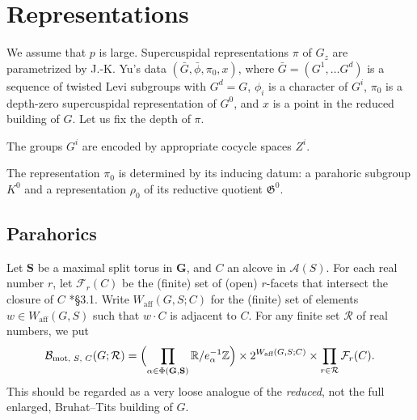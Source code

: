 \documentclass[12pt]{amsart}
\newcommand{\R}{{\mathbb R}}
\newcommand{\Z}{{\mathbb Z}}
\newcommand{\bG}{\mathbf{G}}
\def\R{\mathbb R}
\def\Z{\mathbb Z}
\newcommand{\fG}{\mathfrak G}
\theoremstyle{plain}
\theoremstyle{definition}
\begin{document}
\section{Representations}
We assume that $p$ is large. 
Supercuspidal representations $\pi$ of $G_z$ are parametrized by J.-K. Yu's data 
$(\bar G, \bar\phi, \pi_0, x)$, where $\bar G=(G^1, \dots G^d)$ is a sequence of twisted Levi subgroups with $G^d=G$, $\phi_i$ is a character of $G^i$, $\pi_0$ is a depth-zero supercuspidal representation of $G^0$, and $x$ is a point in the reduced building of $G$.
Let us fix the depth of $\pi$. 

The groups $G^i$ are encoded by appropriate  cocycle spaces $Z^i$.

The representation $\pi_0$ is determined by its inducing datum: a parahoric subgroup $K^0$ and a representation $\rho_0$ of its reductive quotient $\fG^0$. 

\subsection{Parahorics}

\renewcommand\AA{\mathcal A}
\newcommand\affW{W_{\text{aff}}}
\newcommand\BB{\mathcal B}
	\newcommand\motB{\BB_{\text{mot}}}
	\newcommand\motBpin{\BB_{\text{mot, \(S\), \(C\)}}}
\newcommand\bS{\mathbf S}
\newcommand\Cent{C}
\newcommand\dota{\cdot}
\newcommand\field{F}
	\newcommand\unfield{F^{\text{un}}}
\newcommand\Lxxx[1]{\ensuremath\spadesuit\footnote{\ensuremath\spadesuit\ #1}}
	\newcommand\citeme{\Lxxx{Cite me!}}
	\newcommand\refme{\Lxxx{Reference me!}}
\newcommand\muhat{\widehat\mu}
\newcommand\Nchar{\Phi}
\newcommand\NFTorbit{\widehat O}
\newcommand\Simple{\Delta}
\newcommand\st{\mathbin:}

\makeatletter
\newcommand\topcite[1]{\gdef\t@pic{#1}\cite{#1}}
\newcommand\loccit{\expandafter\cite\expandafter{\t@pic}}
\makeatother

Let \(\bS\) be a maximal split torus in  \(\bG\),
and \(C\) an alcove in \(\AA(S)\).
For each real number \(r\), let \(\mathcal F_r(C)\) be the
(finite) set of (open) \(r\)-facets that intersect the
closure of \(C\)
	\cite{debacker:nilpotent}*{\S3.1}.
Write \(\affW(G, S; C)\) for the (finite) set of elements
\(w \in \affW(G, S)\) such that \(w\dota C\) is adjacent to
\(C\).
For any finite set \(\mathcal R\) of real numbers, we put
\[
\motBpin(G; \mathcal R)
= \Bigl(
	\prod_{\alpha \in \Phi(\bG, \bS)} \R/e_\alpha^{-1}\Z
\Bigr) \times 
	2^{\affW(G, S; C)} \times
	\prod_{r \in \mathcal R} \mathcal F_r(C).
\]
This should be regarded as a very loose analogue of the
\emph{reduced}, not the full enlarged, Bruhat--Tits building
of \(G\).
\end{document}
